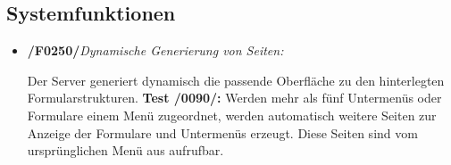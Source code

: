   \vspace{1,5cm}  
  \subsection{Systemfunktionen}
  
    \begin{itemize}
        \item \textbf{/F0250/}\textit{Dynamische Generierung von Seiten:} \par
        Der Server generiert dynamisch die passende Oberfläche zu den hinterlegten Formularstrukturen.
        \noindent \textbf{Test /0090/:} Werden mehr als fünf Untermenüs oder Formulare einem Menü zugeordnet, werden automatisch weitere Seiten zur Anzeige der Formulare und Untermenüs erzeugt. Diese Seiten sind vom ursprünglichen Menü aus aufrufbar.
    \end{itemize}